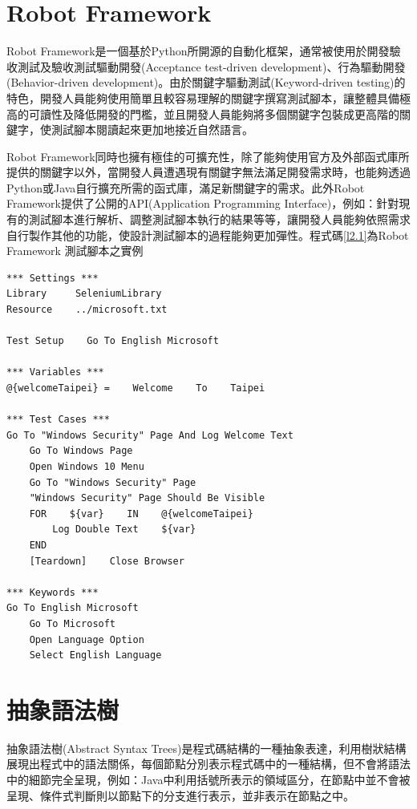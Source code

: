 \section{Robot Framework}\label{s2.2}
\indent
Robot Framework是一個基於Python\cite{python}所開源的自動化框架，通常被使用於開發驗收測試及驗收測試驅動開發(Acceptance test-driven development)\cite{ATDD}、行為驅動開發(Behavior-driven development)\cite{BDD}。由於關鍵字驅動測試(Keyword-driven testing)\cite{robotframework}的特色，開發人員能夠使用簡單且較容易理解的關鍵字撰寫測試腳本，讓整體具備極高的可讀性及降低開發的門檻，並且開發人員能夠將多個關鍵字包裝成更高階的關鍵字，使測試腳本閱讀起來更加地接近自然語言。

\indent
Robot Framework同時也擁有極佳的可擴充性，除了能夠使用官方及外部函式庫所提供的關鍵字以外，當開發人員遭遇現有關鍵字無法滿足開發需求時，也能夠透過Python或Java自行擴充所需的函式庫，滿足新關鍵字的需求。此外Robot Framework提供了公開的API(Application Programming Interface)\cite{RobotFrameworkAPI}，例如：針對現有的測試腳本進行解析、調整測試腳本執行的結果等等，讓開發人員能夠依照需求自行製作其他的功能，使設計測試腳本的過程能夠更加彈性。程式碼\ref{l2.1}為Robot Framework 測試腳本之實例

\begin{lstlisting}[caption=Robot Framework 實例腳本, label={l2.1}]
*** Settings ***
Library     SeleniumLibrary
Resource    ../microsoft.txt

Test Setup    Go To English Microsoft

*** Variables ***
@{welcomeTaipei} =    Welcome    To    Taipei

*** Test Cases ***
Go To "Windows Security" Page And Log Welcome Text
    Go To Windows Page
    Open Windows 10 Menu
    Go To "Windows Security" Page
    "Windows Security" Page Should Be Visible
    FOR    ${var}    IN    @{welcomeTaipei}
        Log Double Text    ${var}
    END
    [Teardown]    Close Browser
    
*** Keywords ***
Go To English Microsoft 
    Go To Microsoft
    Open Language Option
    Select English Language
\end{lstlisting}

\section{抽象語法樹}\label{s2.3}
\indent
抽象語法樹(Abstract Syntax Trees)\cite{AST}是程式碼結構的一種抽象表達，利用樹狀結構展現出程式中的語法關係，每個節點分別表示程式碼中的一種結構，但不會將語法中的細節完全呈現，例如：Java中利用括號所表示的領域區分，在節點中並不會被呈現、條件式判斷則以節點下的分支進行表示，並非表示在節點之中。

